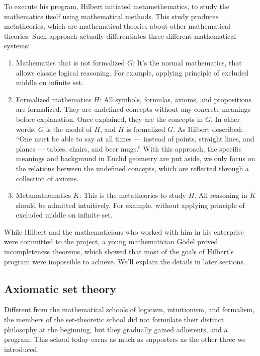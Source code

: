 \documentclass{article}
\begin{document}
To execute his program, Hilbert initiated metamethematics, to study the mathematics itself using mathematical methods. This study produces metatheories, which are mathematical theories about other mathematical theories. Such approach actually differentiates three different mathematical systems:

\begin{enumerate}
\item Mathematics that is not formalized $G$: It's the normal mathematics, that allows classic logical reasoning. For example, applying principle of excluded middle on infinite set.

\item Formalized mathematics $H$: All symbols, formulas, axioms, and propositions are formalized. They are undefined concepts without any concrete meanings before explanation. Once explained, they are the concepts in $G$. In other words, $G$ is the model of $H$, and $H$ is formalized $G$. As Hilbert described: ``One must be able to say at all times — instead of points, straight lines, and planes — tables, chairs, and beer mugs.'' With this approach, the specific meanings and background in Euclid geometry are put aside, we only focus on the relations between the undefined concepts, which are reflected through a collection of axioms.

\item Metamathematics $K$: This is the metatheories to study $H$. All reasoning in $K$ should be admitted intuitively. For example, without applying principle of excluded middle on infinite set.
\end{enumerate}

While Hilbert and the mathematicians who worked with him in his enterprise were committed to the project, a young mathematician Gödel proved incompleteness theorems, which showed that most of the goals of Hilbert's program were impossible to achieve. We'll explain the details in later sections.

\subsection{Axiomatic set theory}

Different from the mathematical schools of logicism, intuitionism, and formalism, the members of the set-theoretic school did not formulate their distinct philosophy at the beginning, but they gradually gained adherents, and a program. This school today earns as much as supporters as the other three we introduced.
\end{document}
